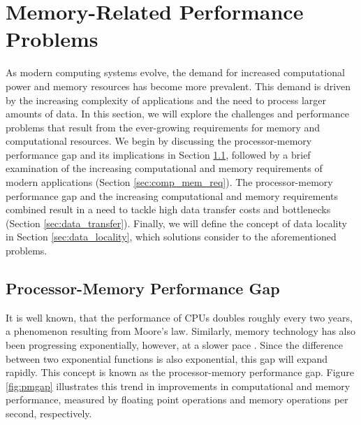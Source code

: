 \section{Memory-Related Performance Problems}\label{sec:background}
As modern computing systems evolve, the demand for increased computational power and memory resources has become more prevalent. This demand is driven by the increasing complexity of applications and the need to process larger amounts of data. In this section, we will explore the challenges and performance problems that result from the ever-growing requirements for memory and computational resources. We begin by discussing the processor-memory performance gap and its implications in Section \ref{sec:pmgap}, followed by a brief examination of the increasing computational and memory requirements of modern applications (Section \ref{sec:comp_mem_req}). The processor-memory performance gap and the increasing computational and memory requirements combined result in a need to tackle high data transfer costs and bottlenecks (Section \ref{sec:data_transfer}). Finally, we will define the concept of data locality in Section \ref{sec:data_locality}, which solutions consider to the aforementioned problems.

\subsection{Processor-Memory Performance Gap}\label{sec:pmgap}
It is well known, that the performance of CPUs doubles roughly every two years, a phenomenon resulting from Moore's law. Similarly, memory technology has also been progressing exponentially, however, at a slower pace \cite{efnusheva2017survey, machanick2002approaches, mckee2004reflections, mccalpin1997survey}. Since the difference between two exponential functions is also exponential, this gap will expand rapidly. This concept is known as the processor-memory performance gap. Figure \ref{fig:pmgap} illustrates this trend in improvements in computational and memory performance, measured by floating point operations and memory operations per second, respectively.

